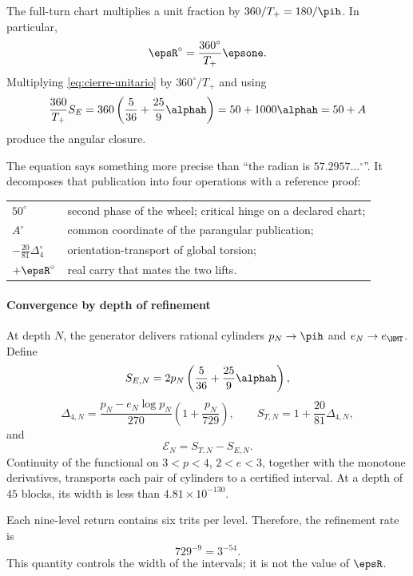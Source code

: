 The full-turn chart multiplies a unit fraction by \(360/T_+=180/\pih\). In particular,
\[
\epsR^\circ=\frac{360^\circ}{T_+}\epsone.
\]
Multiplying \eqref{eq:cierre-unitario} by \(360^\circ/T_+\) and using
\[
\frac{360}{T_+}S_E
=360\left(\frac5{36}+\frac{25}{9}\alphah\right)
=50+1000\alphah=50+A
\]
produce the angular closure.

\begin{theorem}
\BigRadionEquation
\end{theorem}

The equation says something more precise than \enquote{the radian is
\(57.2957\ldots{}^\circ\)}. It decomposes that publication into four operations
with a reference proof:
\begin{center}
\begin{tabularx}{.96\textwidth}{>{\bfseries}l X}
\toprule
\(50^\circ\) & second phase of the wheel; critical hinge on a declared chart;\\
\(A^\circ\) & common coordinate of the parangular publication;\\
\(-\frac{20}{81}\Delta_4^\circ\) & orientation-transport of global torsion;\\
\(+\epsR^\circ\) & real carry that mates the two lifts.\\
\bottomrule
\end{tabularx}
\end{center}

\paragraph{Convergence by depth of refinement}

At depth \(N\), the generator delivers rational cylinders
\(p_N\to\pih\) and \(e_N\to e_{\HMT}\). Define
\[
S_{E,N}=2p_N\left(\frac5{36}+\frac{25}{9}\alphah\right),
\]
\[
\Delta_{4,N}=\frac{p_N-e_N\log p_N}{270}
\left(1+\frac{p_N}{729}\right),\qquad
S_{T,N}=1+\frac{20}{81}\Delta_{4,N},
\]
and
\[
\mathcal E_N=S_{T,N}-S_{E,N}.
\]
Continuity of the functional on \(3<p<4\), \(2<e<3\), together with the
monotone derivatives, transports each pair of cylinders to a certified
interval. At a depth of \(45\) blocks, its width is less than
\(4.81\times10^{-130}\).

Each nine-level return contains six trits per level. Therefore, the refinement rate is
\begin{equation}
729^{-9}=3^{-54}.
\label{eq:contraccion-54}
\end{equation}
This quantity controls the width of the intervals; it is not the value of
\(\epsR\).

